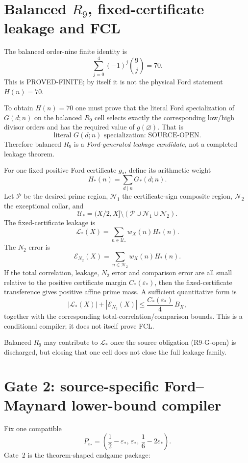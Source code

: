 \documentclass[11pt]{article}
\theoremstyle{definition}
\newcommand{\1}{\mathbf 1}
\newcommand{\status}[1]{\textsf{#1}}
\begin{document}
\section{Balanced $R_9$, fixed-certificate leakage and FCL}
\label{sec:r9-fcl-theory}

The balanced order-nine finite identity is
\[
\boxed{
\sum_{j=0}^{4}(-1)^j\binom9j=70.
}
\tag{R9-70}
\]
This is \status{PROVED-FINITE}; by itself it is not the physical Ford statement
$H(n)=70$.

To obtain $H(n)=70$ one must prove that the literal Ford specialization of $G(d;n)$ on the
balanced $R_9$ cell selects exactly the corresponding low/high divisor orders and has the
required value of $g(\varnothing)$.  That is
\[
\boxed{\text{literal }G(d;n)\text{ specialization: SOURCE-OPEN}.}
\tag{R9-G-open}
\]
Therefore balanced $R_9$ is a \emph{Ford-generated leakage candidate}, not a completed
leakage theorem.

For one fixed positive Ford certificate $g_\ast$, define its arithmetic weight
\[
H_\ast(n)=\sum_{d\mid n}G_\ast(d;n).
\]
Let $\mathcal P$ be the desired prime region, $\mathcal N_1$ the certificate-sign composite
region, $\mathcal N_2$ the exceptional collar, and
\[
\mathcal U_\ast
=
(X/2,X]\setminus(\mathcal P\cup\mathcal N_1\cup\mathcal N_2).
\]
The fixed-certificate leakage is
\[
\boxed{
\mathcal L_\ast(X)
=
\sum_{n\in\mathcal U_\ast}w_X(n)H_\ast(n).
}
\tag{FCL}
\]
The $N_2$ error is
\[
\mathcal E_{N_2}(X)
=
\sum_{n\in\mathcal N_2}w_X(n)H_\ast(n).
\]
If the total correlation, leakage, $N_2$ error and comparison error are all small relative
to the positive certificate margin $C_\ast(\varepsilon_\ast)$, then the fixed-certificate
transference gives positive affine prime mass.  A sufficient quantitative form is
\[
|\mathcal L_\ast(X)|+|\mathcal E_{N_2}(X)|
\le
\frac{C_\ast(\varepsilon_\ast)}4\,B_X,
\tag{FCL-margin}
\]
together with the corresponding total-correlation/comparison bounds.
This is a conditional compiler; it does not itself prove FCL.

Balanced $R_9$ may contribute to $\mathcal L_\ast$ once the source obligation (R9-G-open) is discharged,
but closing that one cell does not close the full leakage family.

\section{Gate 2: source-specific Ford--Maynard lower-bound compiler}
\label{sec:gate2-theory}

Fix one compatible
\[
P_{\varepsilon_\ast}
=
\left(
\frac12-\varepsilon_\ast,\,
\varepsilon_\ast,\,
\frac16-2\varepsilon_\ast
\right).
\]
Gate~2 is the theorem-shaped endgame package:
\end{document}
